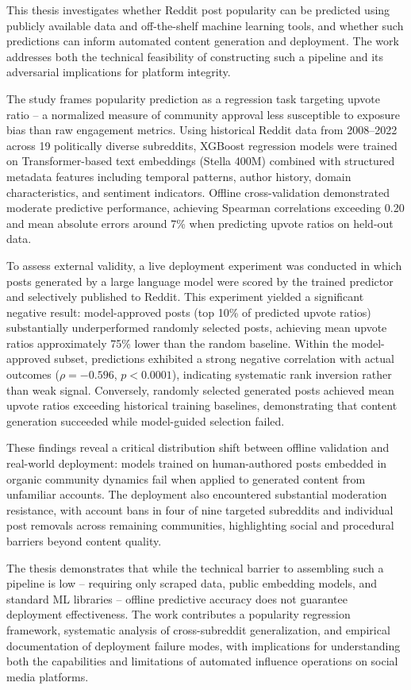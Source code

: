 This thesis investigates whether Reddit post popularity can be predicted using publicly available data and off-the-shelf machine learning tools, and whether such predictions can inform automated content generation and deployment. The work addresses both the technical feasibility of constructing such a pipeline and its adversarial implications for platform integrity.

The study frames popularity prediction as a regression task targeting upvote ratio -- a normalized measure of community approval less susceptible to exposure bias than raw engagement metrics. Using historical Reddit data from 2008--2022 across 19 politically diverse subreddits, XGBoost regression models were trained on Transformer-based text embeddings (Stella 400M) combined with structured metadata features including temporal patterns, author history, domain characteristics, and sentiment indicators. Offline cross-validation demonstrated moderate predictive performance, achieving Spearman correlations exceeding 0.20 and mean absolute errors around 7\% when predicting upvote ratios on held-out data.

To assess external validity, a live deployment experiment was conducted in which posts generated by a large language model were scored by the trained predictor and selectively published to Reddit. This experiment yielded a significant negative result: model-approved posts (top 10\% of predicted upvote ratios) substantially underperformed randomly selected posts, achieving mean upvote ratios approximately 75\% lower than the random baseline. Within the model-approved subset, predictions exhibited a strong negative correlation with actual outcomes ($\rho = -0.596$, $p < 0.0001$), indicating systematic rank inversion rather than weak signal. Conversely, randomly selected generated posts achieved mean upvote ratios exceeding historical training baselines, demonstrating that content generation succeeded while model-guided selection failed.

These findings reveal a critical distribution shift between offline validation and real-world deployment: models trained on human-authored posts embedded in organic community dynamics fail when applied to generated content from unfamiliar accounts. The deployment also encountered substantial moderation resistance, with account bans in four of nine targeted subreddits and individual post removals across remaining communities, highlighting social and procedural barriers beyond content quality.

The thesis demonstrates that while the technical barrier to assembling such a pipeline is low -- requiring only scraped data, public embedding models, and standard ML libraries -- offline predictive accuracy does not guarantee deployment effectiveness. The work contributes a popularity regression framework, systematic analysis of cross-subreddit generalization, and empirical documentation of deployment failure modes, with implications for understanding both the capabilities and limitations of automated influence operations on social media platforms.
